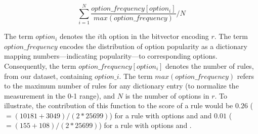 \documentclass[conference]{IEEEtran}
\begin{document}
{\small
\vspace{-2ex}
\[\sum_{i=1}^{N}\frac{\mathit{option\_frequency[option_i]}}{\mathit{max(option\_frequency)}}/N\]
\vspace{-2ex}
}

\noindent
The term $\mathit{option_i}$ denotes the $i$th option in the bitvector
encoding $r$. The term $\mathit{option\_frequency}$ encodes the
distribution of option popularity as a dictionary mapping
numbers---indicating popularity---to corresponding
options. Consequently, the term $\mathit{option\_frequency[option_i]}$
denotes the number of rules, from our dataset, containing
$\mathit{option\_i}$. The term $\mathit{max(option\_frequency)}$
refers to the maximum number of rules for any dictionary entry (to
normalize the measurement in the 0-1 range), and $N$ is the number of
options in $r$. To illustrate, the contribution of this function to
the score of a rule would be $0.26$ ($=(10181+3049)/(2*25699)$) for a
rule with options  and  and $0.01$
($=(155+108)/(2*25699)$) for a rule with options  and
.



\end{document}
